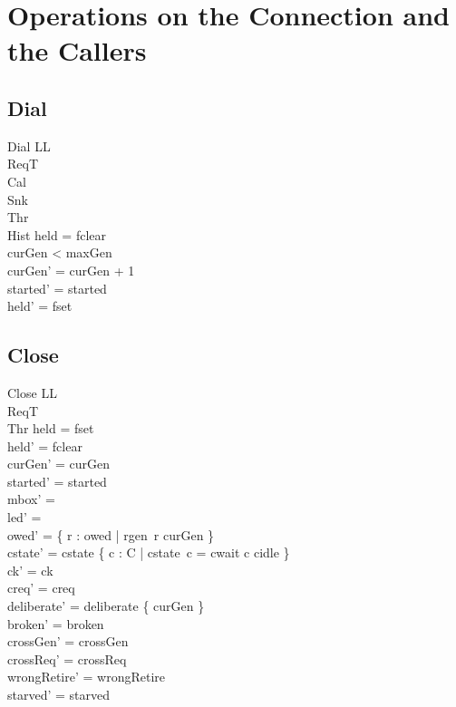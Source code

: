 \documentclass[a4paper,10pt,fleqn]{article}
\begin{document}
\section{Operations on the Connection and the Callers}

\subsection{Dial}

\begin{schema}{Dial}
  \Delta LL \\
  \Xi ReqT \\
  \Xi Cal \\
  \Xi Snk \\
  \Xi Thr \\
  \Xi Hist
\where
  held = fclear \\
  curGen < maxGen \\
  curGen' = curGen + 1 \\
  started' = started \\
  held' = fset
\end{schema}

\subsection{Close}

\begin{schema}{Close}
  \Delta LL \\
  \Xi ReqT \\
  \Xi Thr
\where
  held = fset \\
  held' = fclear \\
  curGen' = curGen \\
  started' = started \\
  mbox' = \emptyset \\
  led' = \emptyset \\
  owed' = \{ r : owed | rgen~r \neq curGen \} \\
  cstate' = cstate \oplus \{ c : C | cstate~c = cwait \spot c \mapsto cidle \} \\
  ck' = ck \\
  creq' = creq \\
  deliberate' = deliberate \cup \{ curGen \} \\
  broken' = broken \\
  crossGen' = crossGen \\
  crossReq' = crossReq \\
  wrongRetire' = wrongRetire \\
  starved' = starved
\end{schema}
\end{document}
